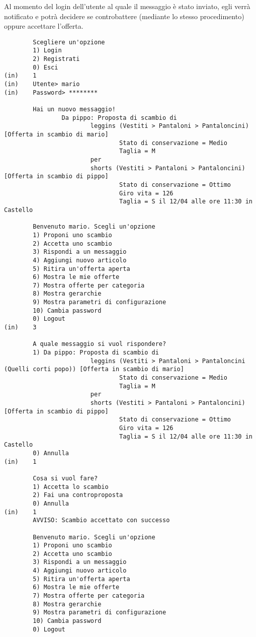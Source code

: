 Al momento del login dell'utente al quale il messaggio è stato inviato, egli verrà notificato e potrà decidere se controbattere (mediante lo stesso procedimento) oppure accettare l'offerta.

\begin{lstlisting}
        Scegliere un'opzione
        1) Login
        2) Registrati
        0) Esci
(in)    1
(in)    Utente> mario
(in)    Password> ********

        Hai un nuovo messaggio!
                Da pippo: Proposta di scambio di
                        leggins (Vestiti > Pantaloni > Pantaloncini) [Offerta in scambio di mario]
                                Stato di conservazione = Medio
                                Taglia = M
                        per
                        shorts (Vestiti > Pantaloni > Pantaloncini) [Offerta in scambio di pippo]
                                Stato di conservazione = Ottimo
                                Giro vita = 126
                                Taglia = S il 12/04 alle ore 11:30 in Castello

        Benvenuto mario. Scegli un'opzione
        1) Proponi uno scambio
        2) Accetta uno scambio
        3) Rispondi a un messaggio
        4) Aggiungi nuovo articolo
        5) Ritira un'offerta aperta
        6) Mostra le mie offerte
        7) Mostra offerte per categoria
        8) Mostra gerarchie
        9) Mostra parametri di configurazione
        10) Cambia password
        0) Logout
(in)    3

        A quale messaggio si vuol rispondere?
        1) Da pippo: Proposta di scambio di
                        leggins (Vestiti > Pantaloni > Pantaloncini (Quelli corti popo)) [Offerta in scambio di mario]
                                Stato di conservazione = Medio
                                Taglia = M
                        per
                        shorts (Vestiti > Pantaloni > Pantaloncini) [Offerta in scambio di pippo]
                                Stato di conservazione = Ottimo
                                Giro vita = 126
                                Taglia = S il 12/04 alle ore 11:30 in Castello
        0) Annulla
(in)    1

        Cosa si vuol fare?
        1) Accetta lo scambio
        2) Fai una controproposta
        0) Annulla
(in)    1
        AVVISO: Scambio accettato con successo

        Benvenuto mario. Scegli un'opzione
        1) Proponi uno scambio
        2) Accetta uno scambio
        3) Rispondi a un messaggio
        4) Aggiungi nuovo articolo
        5) Ritira un'offerta aperta
        6) Mostra le mie offerte
        7) Mostra offerte per categoria
        8) Mostra gerarchie
        9) Mostra parametri di configurazione
        10) Cambia password
        0) Logout
\end{lstlisting}

